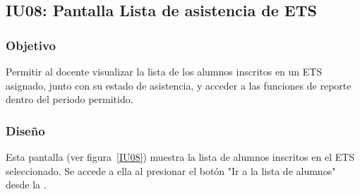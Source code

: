 \subsection{IU08: Pantalla Lista de asistencia de ETS}

\newpage

\subsubsection{Objetivo}
Permitir al docente visualizar la lista de los alumnos inscritos en un ETS asignado, junto con su estado de asistencia, y acceder a las funciones de reporte dentro del periodo permitido.

\subsubsection{Diseño}
Esta pantalla  (ver figura~\ref{IU08}) muestra la lista de alumnos inscritos en el ETS seleccionado. Se accede a ella al presionar el botón "Ir a la lista de alumnos"  desde la .




